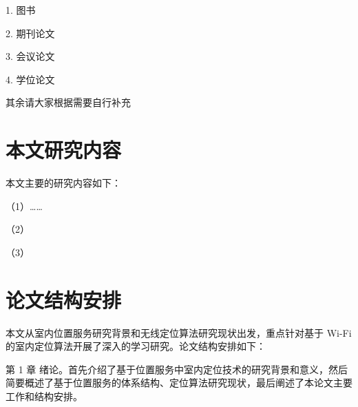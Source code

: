 1. 图书

2. 期刊论文

3. 会议论文

4. 学位论文

其余请大家根据需要自行补充


\section{本文研究内容}

本文主要的研究内容如下：

（1）……

（2）

（3）


\section{论文结构安排}

本文从室内位置服务研究背景和无线定位算法研究现状出发，重点针对基于 Wi-Fi 的室内定位算法开展了深入的学习研究。论文结构安排如下：

第 1 章 绪论。首先介绍了基于位置服务中室内定位技术的研究背景和意义，然后简要概述了基于位置服务的体系结构、定位算法研究现状，最后阐述了本论文主要工作和结构安排。




